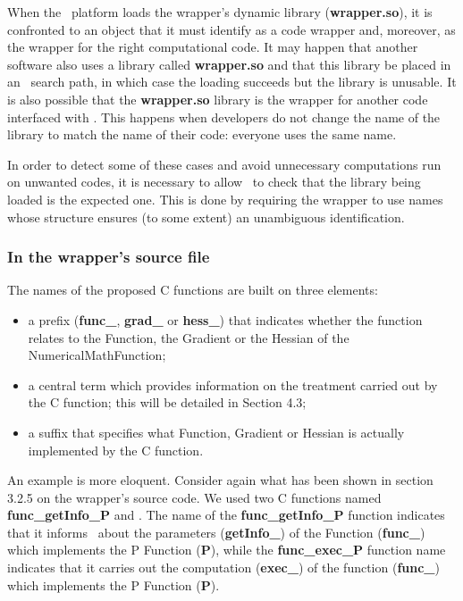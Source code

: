 When the \OT\ platform loads the wrapper's dynamic library ({\bf wrapper.so}), it is confronted to an object that it must identify as a code wrapper and, moreover, as the wrapper for the right computational code. It may happen that another software also uses a library called {\bf wrapper.so} and that this library be placed in an \OT\ search path, in which case the loading succeeds but the library is unusable. It is also possible that the {\bf wrapper.so} library is the wrapper for another code interfaced with \OT . This happens when developers do not change the name of the library to match the name of their code: everyone uses the same name.

In order to detect some of these cases and avoid unnecessary computations run on unwanted codes, it is necessary to allow \OT\ to check that the library being loaded is the expected one. This is done by requiring the wrapper to use names whose structure ensures (to some extent) an unambiguous identification.

\subsubsection{In the wrapper's source file}

The names of the proposed C functions are built on three elements:
\begin{itemize}
\item a prefix ({\bf func\_}, {\bf grad\_} or {\bf hess\_}) that indicates whether the function relates to the Function, the Gradient or the Hessian of the NumericalMathFunction;
\item a central term which provides information on the treatment carried out by the C function; this will be detailed in Section 4.3;
\item a suffix that specifies what Function, Gradient or Hessian is actually implemented by the C function.
\end{itemize}

An example is more eloquent. Consider again what has been shown in section 3.2.5 on the wrapper's source code. We used two C functions named {\bf func\_getInfo\_P} and . The name of the {\bf func\_getInfo\_P} function indicates that it informs \OT\ about the parameters ({\bf getInfo\_}) of the Function ({\bf func\_}) which implements the P Function ({\bf P}), while the {\bf func\_exec\_P} function name indicates that it carries out the computation ({\bf exec\_}) of the function ({\bf func\_}) which implements the P Function ({\bf P}).

